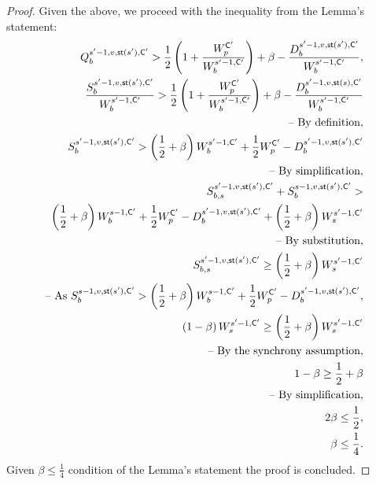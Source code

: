 \documentclass{article}
\begin{document}
\begin{proof}
    Given the above, we proceed with the inequality from the Lemma's statement:
    \begin{align*}
        Q^{s'-1, v, \mathsf{st}(s'), \mathsf{C}'}_{b} > \frac{1}{2}\left(1 + \frac{W^{\mathsf{C}'}_p}{W^{s'-1, \mathsf{C}'}_b}\right) + \beta - \frac{D^{s'-1, v, \mathsf{st}(s'), \mathsf{C}'}_b}{W^{s'-1, \mathsf{C}'}_b},\\
        \frac{S^{s'-1, v, \mathsf{st}(s'), \mathsf{C}'}_{b}}{W^{s'-1, \mathsf{C}'}_{b}} > \frac{1}{2}\left(1 + \frac{W^{\mathsf{C}'}_p}{W^{s'-1, \mathsf{C}'}_b}\right) + \beta - \frac{D^{s'-1, v, \mathsf{st}(s), \mathsf{C}'}_b}{W^{s'-1, \mathsf{C}'}_b}\\ \text{-- By definition},\\
        S^{s'-1, v, \mathsf{st}(s'), \mathsf{C}'}_{b} > \left(\frac{1}{2} + \beta\right){W^{s'-1, \mathsf{C}'}_b} + \frac{1}{2} W^{\mathsf{C}'}_p - D^{s'-1, v, \mathsf{st}(s'), \mathsf{C}'}_b\\ \text{-- By simplification},\\
        S^{s'-1, v, \mathsf{st}(s'), \mathsf{C}'}_{b,s} + S^{s-1, v, \mathsf{st}(s'), \mathsf{C}'}_{b} >\\ \left(\frac{1}{2} + \beta\right){W^{s-1, \mathsf{C}'}_b} + \frac{1}{2} W^{\mathsf{C}'}_p - D^{s'-1, v, \mathsf{st}(s'), \mathsf{C}'}_b + \left(\frac{1}{2} + \beta\right){W^{s'-1, \mathsf{C}'}_s}\\ \text{-- By substitution},\\
        S^{s'-1, v, \mathsf{st}(s'), \mathsf{C}'}_{b,s} \geq \left(\frac{1}{2} + \beta\right){W^{s'-1, \mathsf{C}'}_s}\\ \text{-- As } S^{s-1, v, \mathsf{st}(s'), \mathsf{C}'}_{b} > \left(\frac{1}{2} + \beta\right){W^{s-1, \mathsf{C}'}_b} + \frac{1}{2} W^{\mathsf{C}'}_p - D^{s'-1, v, \mathsf{st}(s'), \mathsf{C}'}_b,\\
        \left(1-\beta\right){W^{s'-1, \mathsf{C}'}_s} \geq \left(\frac{1}{2} + \beta\right){W^{s'-1, \mathsf{C}'}_s}\\ \text{-- By the synchrony assumption},\\
        1-\beta \geq \frac{1}{2} + \beta\\ \text{-- By simplification},\\
        2\beta \leq \frac{1}{2},\\
        \beta \leq \frac{1}{4}.
    \end{align*}
    Given $\beta \leq \frac{1}{4}$ condition of the Lemma's statement the proof is concluded.
\end{proof}
\end{document}
